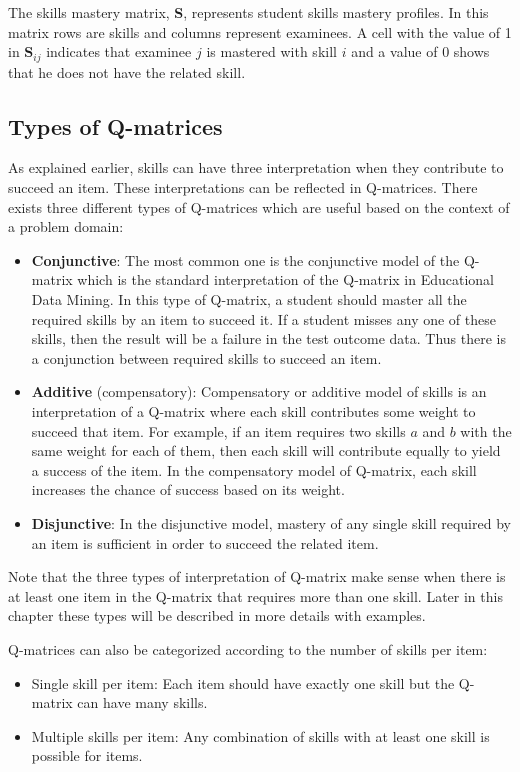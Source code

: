 The skills mastery matrix, \textbf{S}, represents student skills mastery profiles. In this matrix rows are skills and columns represent examinees. A cell with the value of 1 in $\mathbf{S}_{ij}$ indicates that examinee $j$ is mastered with skill $i$ and a value of 0 shows that he does not have the related skill.

\subsection{Types of Q-matrices}
 
As explained earlier, skills can have three interpretation when they contribute to succeed an item. These interpretations can be reflected in Q-matrices. There exists three different types of Q-matrices which are useful based on the context of a problem domain:

\begin{itemize}
\item \textbf{Conjunctive}: The most common one is the conjunctive model of the Q-matrix which is the standard interpretation of the Q-matrix in Educational Data Mining. In this type of Q-matrix, a student should master all the required skills by an item to succeed it. If a student misses any one of these skills, then the result will be a failure in the test outcome data. Thus there is a conjunction between required skills to succeed an item.

\item \textbf{Additive} (compensatory): Compensatory or additive model of skills is an interpretation of a Q-matrix where each skill contributes some weight to succeed that item. For example, if an item requires two skills $a$ and $b$ with the same weight for each of them, then each skill will contribute equally to yield a success of the item. In the compensatory model of Q-matrix, each skill increases the chance of success based on its weight.

\item \textbf{Disjunctive}: In the disjunctive model, mastery of any single skill required by an item is sufficient in order to succeed the related item.
\end{itemize}

Note that the three types of interpretation of Q-matrix make sense when there is at least one item in the Q-matrix that requires more than one skill. Later in this chapter these types will be described in more details with examples.


Q-matrices can also be categorized according to the number of skills per item:
\begin{itemize}
\item Single skill per item: Each item should have exactly one skill but the Q-matrix can have many skills.
\item Multiple skills per item: Any combination of skills with at least one skill is possible for items.
\end{itemize}

